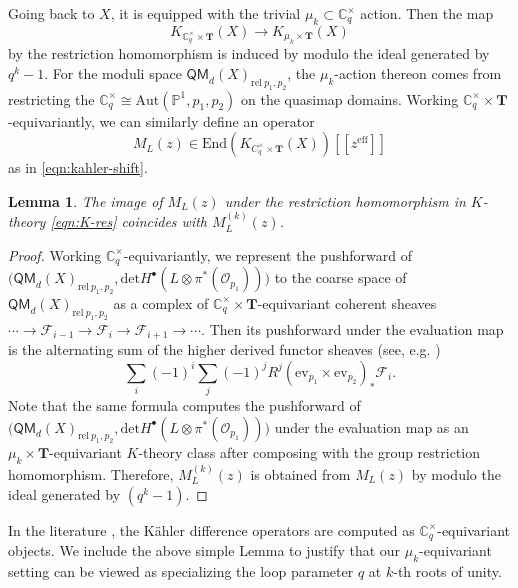 \documentclass[reqno]{amsart}
\numberwithin{equation}{section}
\numberwithin{equation}{section}
\numberwithin{equation}{section}
\newtheorem{lemma}[thm]{Lemma}
\theoremstyle{definition}
\theoremstyle{remark}
\theoremstyle{remark}
\begin{document}
Going back to $X$, it is equipped with the trivial $\mu_k \subset \mathbb{C}^{\times}_q$ action. Then the map
\begin{equation}\label{eqn:K-res}
    K_{\mathbb{C}^{\times}_q \times \mathbf{T}} (X) \to K_{\mu_k \times \mathbf{T}} (X)
\end{equation}
by the restriction homomorphism is induced by modulo the ideal generated by $q^k - 1$. For the moduli space $\mathsf{QM}_{d}(X)_{\mathrm{rel} \ p_1, p_2}$, the $\mu_k$-action thereon comes from restricting the $\mathbb{C}^{\times}_q \cong \mathrm{Aut}(\mathbb{P}^1, p_1, p_2)$ on the quasimap domains. Working $\mathbb{C}^{\times}_q \times \mathbf{T}$-equivariantly, we can similarly define an operator
\begin{equation}\label{eqn:kahler-connection}
    M_{L}(z) \in \mathrm{End}(K_{C^{\times}_{q} \times \mathbf{T}}(X))[\![ z^{\mathrm{eff}} ]\!]
\end{equation}
as in \eqref{eqn:kahler-shift}.
\begin{lemma}\label{lemma:trivial}
    The image of $M_{L}(z)$ under the restriction homomorphism in $K$-theory \eqref{eqn:K-res} coincides with $M_{L}^{(k)}(z)$.
\end{lemma}
\begin{proof}
    Working $\mathbb{C}^{\times}_q$-equivariantly, we represent the pushforward of $\big( \mathsf{QM}_{d}(X)_{\mathrm{rel} \ p_1, p_2}, \mathrm{det} H^{\bullet}(L \otimes \pi^*(\mathcal{O}_{p_1})) \big)$ to the coarse space of $\mathsf{QM}_{d}(X)_{\mathrm{rel} \ p_1, p_2}$ as a complex of $\mathbb{C}^{\times}_q \times \mathbf{T}$-equivariant coherent sheaves $\cdots \to \mathcal{F}_{i-1} \to \mathcal{F}_i \to \mathcal{F}_{i+1} \to \cdots$. Then its pushforward under the evaluation map is the alternating sum of the higher derived functor sheaves (see, e.g. \cite[Section 5.2.13]{chriss-ginzburg})
    \begin{equation}
        \sum_i (-1)^i\sum_j(-1)^j R^j (\mathrm{ev}_{p_1} \times \mathrm{ev}_{p_2})_*\mathcal{F}_i.
    \end{equation}
    Note that the same formula computes the pushforward of $\big( \mathsf{QM}_{d}(X)_{\mathrm{rel} \ p_1, p_2}, \mathrm{det} H^{\bullet}(L \otimes \pi^*(\mathcal{O}_{p_1})) \big)$ under the evaluation map as an $\mu_k \times \mathbf{T}$-equivariant $K$-theory class after composing with the group restriction homomorphism. Therefore, $M_{L}^{(k)}(z)$ is obtained from $M_{L}(z)$ by modulo the ideal generated by $(q^k - 1)$. 
\end{proof}
In the literature \cite{Oko17, okounkov-smirnov}, the K\"ahler difference operators are computed as $\mathbb{C}^{\times}_q$-equivariant objects. We include the above simple Lemma to justify that our $\mu_k$-equivariant setting can be viewed as specializing the loop parameter $q$ at $k$-th roots of unity.
\end{document}

